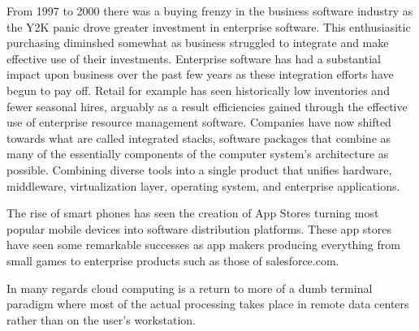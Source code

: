 From 1997 to 2000 there was a buying frenzy in the business software industry as the Y2K panic drove greater investment in enterprise software.\autocite[]{AftermathOfIntegratedStack}
This enthusiasitic purchasing diminshed somewhat as business struggled to integrate and make effective use of their investments.\autocite[]{AftermathOfIntegratedStack}
Enterprise software has had a substantial impact upon business over the past few years as these integration efforts have begun to pay off. Retail for example has seen historically low inventories and fewer seasonal hires, arguably as a result efficiencies gained through the effective use of enterprise resource management software. \autocite[]{AftermathOfIntegratedStack}
Companies have now shifted towards what are called integrated stacks, software packages that combine as many of the essentially components of the computer system's architecture as possible. Combining diverse tools into a single product that unifies hardware, middleware, virtualization layer, operating system, and enterprise applications.\autocite[]{AftermathOfIntegratedStack}

The rise of smart phones has seen the creation of App Stores turning most popular mobile devices into software distribution platforms.\autocite[]{TheAppEconomy}
These app stores have seen some remarkable successes as app makers producing everything from small games to enterprise products such as those of salesforce.com.\autocite[45]{TheAppEconomy}

In many regards cloud computing is a return to more of a dumb terminal paradigm where most of the actual processing takes place in remote data centers rather than on the user's workstation.\autocite[]{LargeParadigmShiftCloudComputing}
